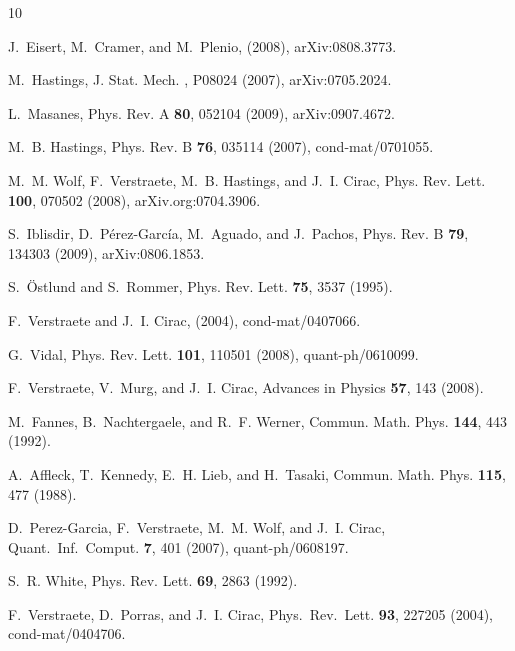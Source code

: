\documentclass{article}
\theoremstyle{plain}
\theoremstyle{definition}
\numberwithin{equation}{section}  %
\begin{document}
\begin{thebibliography}{10}

    J.~Eisert, M.~Cramer, and M.~Plenio,
    \newblock (2008), arXiv:0808.3773.

    M.~Hastings,
    \newblock J. Stat. Mech. , P08024 (2007), arXiv:0705.2024.

    L.~Masanes,
    \newblock Phys. Rev. A {\bf 80}, 052104 (2009), arXiv:0907.4672.

    M.~B. Hastings,
    \newblock Phys. Rev. B {\bf 76}, 035114 (2007), cond-mat/0701055.

    M.~M. Wolf, F.~Verstraete, M.~B. Hastings, and J.~I. Cirac,
    \newblock Phys. Rev. Lett. {\bf 100}, 070502 (2008), arXiv.org:0704.3906.

    S.~Iblisdir, D.~P\'erez-Garc\'ia, M.~Aguado, and J.~Pachos,
    \newblock Phys. Rev. B {\bf 79}, 134303 (2009), arXiv:0806.1853.

    S.~\"Ostlund and S.~Rommer,
    \newblock Phys. Rev. Lett. {\bf 75}, 3537 (1995).

    F.~Verstraete and J.~I. Cirac,
    \newblock (2004), cond-mat/0407066.

    G.~Vidal,
    \newblock Phys. Rev. Lett. {\bf 101}, 110501 (2008), quant-ph/0610099.

    F.~Verstraete, V.~Murg, and J.~I. Cirac,
    \newblock Advances in Physics {\bf 57}, 143 (2008).

    M.~Fannes, B.~Nachtergaele, and R.~F. Werner,
    \newblock Commun. Math. Phys. {\bf 144}, 443 (1992).

    A.~Affleck, T.~Kennedy, E.~H. Lieb, and H.~Tasaki,
    \newblock Commun. Math. Phys. {\bf 115}, 477 (1988).

    D.~Perez-Garcia, F.~Verstraete, M.~M. Wolf, and J.~I. Cirac,
    \newblock Quant.\ Inf.\ Comput. {\bf 7}, 401 (2007), quant-ph/0608197.

    S.~R. White,
    \newblock Phys. Rev. Lett. {\bf 69}, 2863 (1992).

    F.~Verstraete, D.~Porras, and J.~I. Cirac,
    \newblock Phys.\ Rev.\ Lett. {\bf 93}, 227205 (2004), cond-mat/0404706.


\end{thebibliography}
\end{document}
